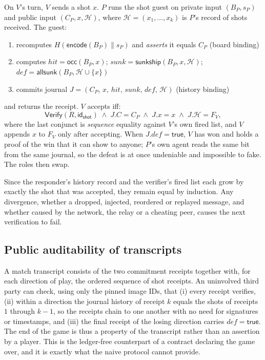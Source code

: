 \documentclass[11pt,a4paper]{article}
\newcommand{\C}{\ensuremath{C}}
\begin{document}
On $V$'s turn, $V$ sends a shot $x$. $P$ runs the \textsf{shot} guest on
private input $(B_P, s_P)$ and public input $(\C_P, x, \mathcal{H})$, where
$\mathcal{H} = (x_1, \dots, x_k)$ is $P$'s record of shots received. The
guest:
\begin{enumerate}[noitemsep,topsep=2pt]
\item recomputes $H(\mathsf{encode}(B_P)\|s_P)$ and \emph{asserts} it equals
      $\C_P$ \hfill (board binding)
\item computes $\mathit{hit} = \mathsf{occ}(B_P, x)$;\quad
      $\mathit{sunk} = \mathsf{sunkship}(B_P, x, \mathcal{H})$;\quad
      $\mathit{def} = \mathsf{allsunk}(B_P, \mathcal{H} \cup \{x\})$
\item commits journal
      $J = (\C_P,\, x,\, \mathit{hit},\, \mathit{sunk},\, \mathit{def},\,
      \mathcal{H})$ \hfill (history binding)
\end{enumerate}
and returns the receipt. $V$ accepts iff:
\[
\mathsf{Verify}(R, \mathsf{id}_{\mathsf{shot}}) \;\wedge\;
J.\C = \C_P \;\wedge\; J.x = x \;\wedge\; J.\mathcal{H} = F_V ,
\]
where the last conjunct is \emph{sequence} equality against $V$'s own fired
list, and $V$ appends $x$ to $F_V$ only after accepting. When $J.\mathit{def} =
\textsf{true}$, $V$ has won and holds a proof of the win that it can show to
anyone; $P$'s own agent reads the same bit from the same journal, so the defeat
is at once undeniable and impossible to fake. The roles then swap.

Since the responder's history record and the verifier's fired list each grow by
exactly the shot that was accepted, they remain equal by induction. Any
divergence, whether a dropped, injected, reordered or replayed message, and
whether caused by the network, the relay or a cheating peer, causes the next
verification to fail.

\subsection{Public auditability of transcripts}
\label{sec:audit}

A match transcript consists of the two commitment receipts together with, for
each direction of play, the ordered sequence of shot receipts. An uninvolved
third party can check, using only the pinned image IDs, that (i) every receipt
verifies, (ii) within a direction the journal history of receipt $k$ equals the
shots of receipts $1$ through $k-1$, so the receipts chain to one another with
no need for signatures or timestamps, and (iii) the final receipt of the losing
direction carries $\mathit{def} = \textsf{true}$. The end of the game is thus a
property of the transcript rather than an assertion by a player. This is the
ledger-free counterpart of a contract declaring the game over, and it is
exactly what the naive protocol cannot provide.
\end{document}
